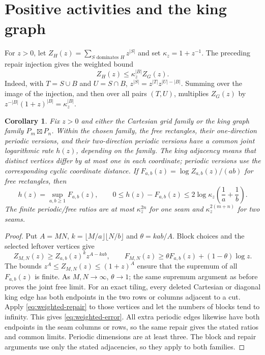 \documentclass[11pt]{article}
\newtheorem{corollary}[theorem]{Corollary}
\begin{document}
\section{Positive activities and the king graph}
For $z>0$, let $Z_H(z)=\sum_{S\text{ dominates }H}z^{|S|}$ and set
$\kappa_z=1+z^{-1}$. The preceding repair injection gives the weighted
bound
\begin{equation}\label{eq:weighted-repair}
 Z_H(z)\le\kappa_z^{|B|} Z_G(z).
\end{equation}
Indeed, with $T=S\cup B$ and $U=S\cap B$,
$z^{|S|}=z^{|T|}z^{|U|-|B|}$. Summing over the image of the injection,
and then over all pairs $(T,U)$, multiplies $Z_G(z)$ by
$z^{-|B|}(1+z)^{|B|}=\kappa_z^{|B|}$.

\begin{corollary}\label{cor:weighted}
Fix $z>0$ and either the Cartesian grid family or the king graph family
$P_m\boxtimes P_n$. Within the chosen family, the free rectangles,
their one-direction periodic versions, and their two-direction periodic
versions have a common joint logarithmic rate $h(z)$, depending on the
family. The king adjacency
means that distinct vertices differ by at most one in each coordinate;
periodic versions use the corresponding cyclic coordinate distance.
If $F_{a,b}(z)=\log Z_{a,b}(z)/(ab)$ for free rectangles, then
\begin{equation}\label{eq:weighted-error}
 h(z)=\sup_{a,b\ge1}F_{a,b}(z),\qquad
 0\le h(z)-F_{a,b}(z)
 \le 2\log\kappa_z\left(\frac1a+\frac1b\right).
\end{equation}
The finite periodic/free ratios are at most $\kappa_z^{2n}$ for one
seam and $\kappa_z^{2(m+n)}$ for two seams.
\end{corollary}
\begin{proof}
Put $A=MN$, $k=\lfloor M/a\rfloor\lfloor N/b\rfloor$ and
$\theta=kab/A$. Block choices and the selected leftover vertices give
\[
 Z_{M,N}(z)\ge Z_{a,b}(z)^k z^{A-kab},\qquad
 F_{M,N}(z)\ge\theta F_{a,b}(z)+(1-\theta)\log z.
\]
The bounds $z^A\le Z_{M,N}(z)\le(1+z)^A$ ensure that the supremum
of all $F_{a,b}(z)$ is finite. As $M,N\to\infty$, $\theta\to1$;
the same supremum argument as before proves the joint free limit.
For an exact tiling, every deleted Cartesian or diagonal king edge has
both endpoints in the two rows or columns adjacent to a cut.
Apply \eqref{eq:weighted-repair} to those vertices and let the numbers
of blocks tend to infinity. This gives \eqref{eq:weighted-error}.
All extra periodic edges likewise have both endpoints in the seam
columns or rows, so the same repair gives the stated ratios and common
limits. Periodic dimensions are at least three. The block and repair
arguments use only the stated adjacencies, so they apply to both families.
\end{proof}
\end{document}
